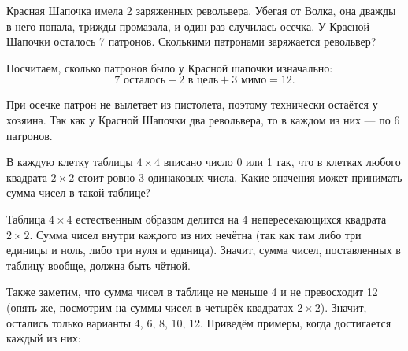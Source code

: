 
\begin{itemize}

	\itA Красная Шапочка имела 2 заряженных револьвера. Убегая от Волка, она дважды в него попала, трижды промазала, и один раз случилась осечка. У Красной Шапочки осталось 7 патронов. Сколькими патронами заряжается револьвер?
	
	\itr Посчитаем, сколько патронов было у Красной шапочки изначально:
	$$7\text{ осталось} + 2\text{ в цель} + 3\text{ мимо} = 12.$$
	
	При осечке патрон не вылетает из пистолета, поэтому технически остаётся у хозяина. Так как у Красной Шапочки два револьвера, то в каждом из них — по 6 патронов.
	
	\itB В каждую клетку таблицы $4 \times 4$ вписано число 0 или 1 так, что в клетках любого квадрата $2 \times 2$ стоит ровно 3 одинаковых числа. Какие значения может принимать сумма чисел в такой таблице?
	
	\itr Таблица $4 \times 4$ естественным образом делится на 4 непересекающихся квадрата $2 \times 2$. Сумма чисел внутри каждого из них нечётна (так как там либо три единицы и ноль, либо три нуля и единица). Значит, сумма чисел, поставленных в таблицу вообще, должна быть чётной.
	
	Также заметим, что сумма чисел в таблице не меньше 4 и не превосходит 12 (опять же, посмотрим на суммы чисел в четырёх квадратах $2 \times 2$). Значит, остались только варианты 4, 6, 8, 10, 12. Приведём примеры, когда достигается каждый из них:
	

\end{itemize}
